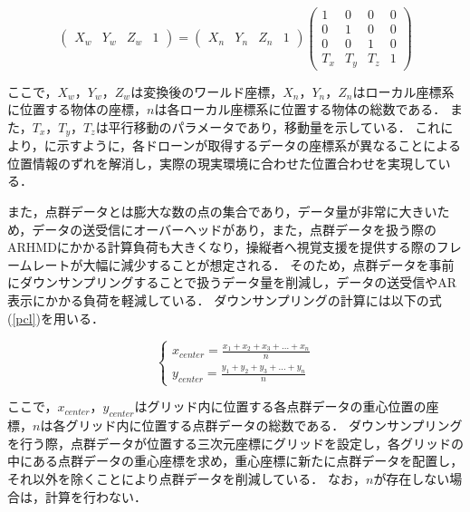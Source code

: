 \documentclass[a4paper,11pt]{ujreport}
\begin{document}
\begin{equation}
  \label{world}
  \begin{pmatrix} X_w & Y_w & Z_w & 1 \end{pmatrix} = \begin{pmatrix} X_n & Y_n & Z_n & 1 \end{pmatrix} \begin{pmatrix} 1 & 0 & 0 & 0 \\ 0 & 1 & 0 & 0 \\ 0 & 0 & 1 & 0 \\ T_x & T_y & T_z & 1 \end{pmatrix}
\end{equation}

ここで，$X_{w}$，$Y_{w}$，$Z_{w}$は変換後のワールド座標，$X_{n}$，$Y_{n}$，$Z_{n}$はローカル座標系に位置する物体の座標，${n}$は各ローカル座標系に位置する物体の総数である．
また，$T_{x}$，$T_{y}$，$T_{z}$は平行移動のパラメータであり，移動量を示している．
これにより，に示すように，各ドローンが取得するデータの座標系が異なることによる位置情報のずれを解消し，実際の現実環境に合わせた位置合わせを実現している．

また，点群データとは膨大な数の点の集合であり，データ量が非常に大きいため，データの送受信にオーバーヘッドがあり，また，点群データを扱う際のARHMDにかかる計算負荷も大きくなり，操縦者へ視覚支援を提供する際のフレームレートが大幅に減少することが想定される．
そのため，点群データを事前にダウンサンプリングすることで扱うデータ量を削減し，データの送受信やAR表示にかかる負荷を軽減している．
ダウンサンプリングの計算には以下の式(\ref{pcl})を用いる．

\begin{equation}
  \label{pcl}
  \left\{
    \begin{aligned}
    x_{center}=\frac{x_{1}+x_{2}+x_{3}+ \dots + x_{n}}{n}\\
    y_{center}=\frac{y_{1}+y_{2}+y_{3}+ \dots + y_{n}}{n}
  \end{aligned}
  \right.
\end{equation}

ここで，$x_{center}$，$y_{center}$はグリッド内に位置する各点群データの重心位置の座標，${n}$は各グリッド内に位置する点群データの総数である．
ダウンサンプリングを行う際，点群データが位置する三次元座標にグリッドを設定し，各グリッドの中にある点群データの重心座標を求め，重心座標に新たに点群データを配置し，それ以外を除くことにより点群データを削減している．
なお，${n}$が存在しない場合は，計算を行わない．
\end{document}
